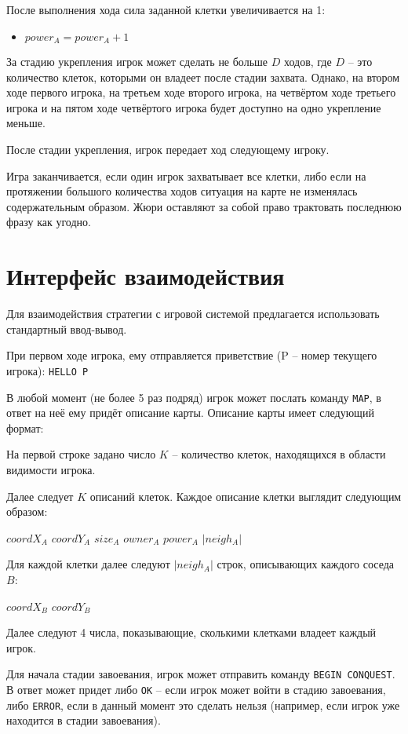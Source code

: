 \documentclass[12pt, a4paper]{article}
\begin{document}
После выполнения хода сила заданной клетки увеличивается на 1:

\begin{itemize}
\item $power_A = power_A + 1$
\end{itemize}

За стадию укрепления игрок может сделать не больше $D$ ходов, где $D$ -- это количество клеток, которыми он владеет после стадии захвата. Однако, на втором ходе первого игрока, на третьем ходе второго игрока, на четвёртом ходе третьего игрока и на пятом ходе четвёртого игрока будет доступно на одно укрепление меньше.

После стадии укрепления, игрок передает ход следующему игроку.

Игра заканчивается, если один игрок захватывает все клетки, либо если на протяжении большого количества ходов ситуация на карте не изменялась содержательным образом. Жюри оставляют за собой право трактовать последнюю фразу как угодно.

{\section{Интерфейс взаимодействия}}

Для взаимодействия стратегии с игровой системой предлагается использовать стандартный ввод-вывод.

При первом ходе игрока, ему отправляется приветствие (P -- номер текущего игрока): \texttt{HELLO P}

В любой момент (не более 5 раз подряд) игрок может послать команду \texttt{MAP}, в ответ на неё ему придёт описание карты. Описание карты имеет следующий формат:

На первой строке задано число $K$ -- количество клеток, находящихся в области видимости игрока.

Далее следует $K$ описаний клеток. Каждое описание клетки выглядит следующим образом:

$coordX_A$ $coordY_A$ $size_A$ $owner_A$ $power_A$ $|{neigh_A}|$

Для каждой клетки далее следуют $|{neigh_A}|$ строк, описывающих каждого соседа $B$:

$coordX_B$ $coordY_B$

Далее следуют 4 числа, показывающие, сколькими клетками владеет каждый игрок.

Для начала стадии завоевания, игрок может отправить команду \texttt{BEGIN CONQUEST}. В ответ может придет либо \texttt{OK} -- если игрок может войти в стадию завоевания, либо \texttt{ERROR}, если в данный момент это сделать нельзя (например, если игрок уже находится в стадии завоевания).
\end{document}
